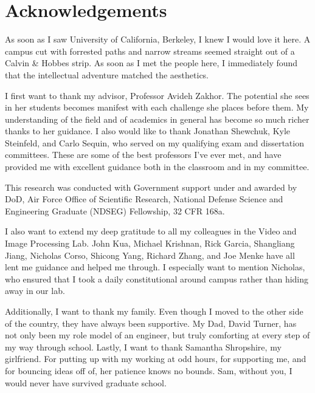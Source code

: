 \documentclass[12pt,onecolumn,oneside]{book}
\begin{document}
\newpage
\cleardoublepage
{}
{}
\chapter*{Acknowledgements}

As soon as I saw University of California, Berkeley, I knew I would love it here.  A campus cut with forrested paths and narrow streams seemed straight out of a Calvin \& Hobbes strip.  As soon as I met the people here, I immediately found that the intellectual adventure matched the aesthetics.

I first want to thank my advisor, Professor Avideh Zakhor.  The potential she sees in her students becomes manifest with each challenge she places before them.  My understanding of the field and of academics in general has become so much richer thanks to her guidance.  I also would like to thank Jonathan Shewchuk, Kyle Steinfeld, and Carlo Sequin, who served on my qualifying exam and dissertation committees.  These are some of the best professors I've ever met, and have provided me with excellent guidance both in the classroom and in my committee.

This research was conducted with Government support under and awarded by DoD, Air Force Office of Scientific Research, National Defense Science and Engineering Graduate (NDSEG) Fellowship, 32 CFR 168a.

I also want to extend my deep gratitude to all my colleagues in the Video and Image Processing Lab.  John Kua, Michael Krishnan, Rick Garcia, Shangliang Jiang, Nicholas Corso, Shicong Yang, Richard Zhang, and Joe Menke have all lent me guidance and helped me through.  I especially want to mention Nicholas, who ensured that I took a daily constitutional around campus rather than hiding away in our lab.

Additionally, I want to thank my family.  Even though I moved to the other side of the country, they have always been supportive.  My Dad, David Turner, has not only been my role model of an engineer, but truly comforting at every step of my way through school.  Lastly, I want to thank Samantha Shropshire, my girlfriend.  For putting up with my working at odd hours, for supporting me, and for bouncing ideas off of, her patience knows no bounds.  Sam, without you, I would never have survived graduate school.
\end{document}
